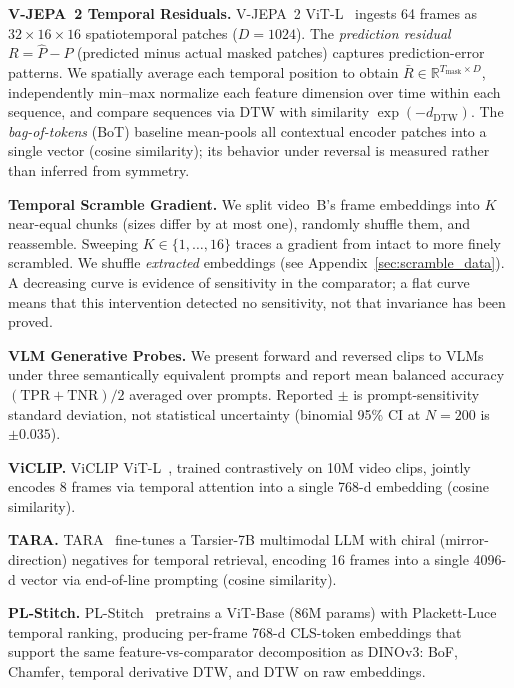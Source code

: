 \documentclass{article}
\theoremstyle{remark}
\begin{document}
\textbf{V-JEPA~2 Temporal Residuals.} V-JEPA~2 ViT-L~\cite{vjepa2} ingests 64 frames as $32 \times 16 \times 16$ spatiotemporal patches ($D\!=\!1024$). The \emph{prediction residual} $R = \hat{P} - P$ (predicted minus actual masked patches) captures prediction-error patterns. We spatially average each temporal position to obtain $\bar{R} \in \mathbb{R}^{T_\text{mask} \times D}$, independently min--max normalize each feature dimension over time within each sequence, and compare sequences via DTW with similarity $\exp(-d_\text{DTW})$. The \emph{bag-of-tokens} (BoT) baseline mean-pools all contextual encoder patches into a single vector (cosine similarity); its behavior under reversal is measured rather than inferred from symmetry.

\textbf{Temporal Scramble Gradient.} We split video~B's frame embeddings into $K$ near-equal chunks (sizes differ by at most one), randomly shuffle them, and reassemble. Sweeping $K \in \{1, \ldots, 16\}$ traces a gradient from intact to more finely scrambled. We shuffle \emph{extracted} embeddings (see Appendix~\ref{sec:scramble_data}). A decreasing curve is evidence of sensitivity in the comparator; a flat curve means that this intervention detected no sensitivity, not that invariance has been proved.

\textbf{VLM Generative Probes.} We present forward and reversed clips to VLMs under three semantically equivalent prompts and report mean balanced accuracy $(\mathrm{TPR}+\mathrm{TNR})/2$ averaged over prompts. Reported $\pm$ is prompt-sensitivity standard deviation, not statistical uncertainty (binomial 95\% CI at $N\!=\!200$ is $\pm 0.035$).

\textbf{ViCLIP.} ViCLIP ViT-L~\cite{viclip}, trained contrastively on 10M video clips, jointly encodes 8 frames via temporal attention into a single 768-d embedding (cosine similarity).

\textbf{TARA.} TARA~\cite{tara} fine-tunes a Tarsier-7B multimodal LLM with chiral (mirror-direction) negatives for temporal retrieval, encoding 16 frames into a single 4096-d vector via end-of-line prompting (cosine similarity).

\textbf{PL-Stitch.} PL-Stitch~\cite{plstitch} pretrains a ViT-Base (86M params) with Plackett-Luce temporal ranking, producing per-frame 768-d CLS-token embeddings that support the same feature-vs-comparator decomposition as DINOv3: BoF, Chamfer, temporal derivative DTW, and DTW on raw embeddings.
\end{document}
